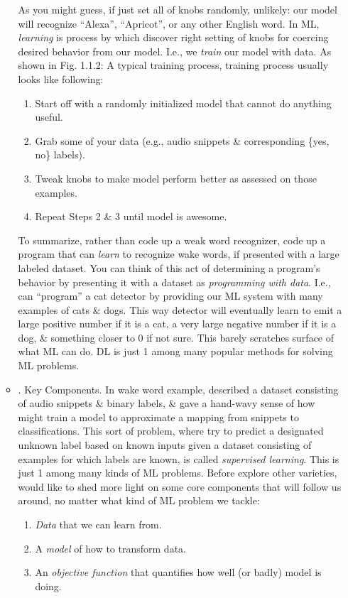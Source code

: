 \documentclass{article}
\begin{document}
\begin{itemize}
\begin{itemize}
		As you might guess, if just set all of knobs randomly, unlikely: our model will recognize ``Alexa'', ``Apricot'', or any other English word. In ML, {\it learning} is process by which discover right setting of knobs for coercing desired behavior from our model. I.e., we {\it train} our model with data. As shown in {\sf Fig. 1.1.2: A typical training process}, training process usually looks like following:
		\begin{enumerate}
			\item Start off with a randomly initialized model that cannot do anything useful.
			\item Grab some of your data (e.g., audio snippets \& corresponding \{yes, no\} labels).
			\item Tweak knobs to make model perform better as assessed on those examples.
			\item Repeat Steps 2 \& 3 until model is awesome.
		\end{enumerate}
		To summarize, rather than code up a weak word recognizer, code up a program that can {\it learn} to recognize wake words, if presented with a large labeled dataset. You can think of this act of determining a program's behavior by presenting it with a dataset as {\it programming with data}. I.e., can ``program'' a cat detector by providing our ML system with many examples of cats \& dogs. This way detector will eventually learn to emit a large positive number if it is a cat, a very large negative number if it is a dog, \& something closer to 0 if not sure. This barely scratches surface of what ML can do. DL is just 1 among many popular methods for solving ML problems.
		\item {. Key Components.} In wake word example, described a dataset consisting of audio snippets \& binary labels, \& gave a hand-wavy sense of how might train a model to approximate a mapping from snippets to classifications. This sort of problem, where try to predict a designated unknown label based on known inputs given a dataset consisting of examples for which labels are known, is called {\it supervised learning}. This is just 1 among many kinds of ML problems. Before explore other varieties, would like to shed more light on some core components that will follow us around, no matter what kind of ML problem we tackle:
		\begin{enumerate}
			\item {\it Data} that we can learn from.
			\item A {\it model} of how to transform data.
			\item An {\it objective function} that quantifies how well (or badly) model is doing.

\end{enumerate}
\end{itemize}
\end{itemize}
\end{document}
